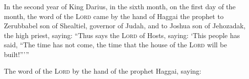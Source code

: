 
\begin{inparaenum}
     In the second year of King Darius, in the sixth month, on the first day of the month, the word of the \textsc{Lord} came by the hand of Haggai the prophet to Zerubbabel son of Shealtiel, governor of Judah, and to Joshua son of Jehozadak, the high priest, saying:%
     ``Thus says the \textsc{Lord} of Hosts, saying: `This people has said, ``The time has not come, the time that the house of the \textsc{Lord} will be built!''\thinspace'\thinspace''%
    
     The word of the \textsc{Lord} by the hand of the prophet Haggai, saying:\smallskip%
    
    
    
    
    
    
    
    \bigskip%
    
     \smallskip%
    
    \pvca{}%
    
    
    \pvcc{}{}{}%
    
    
    \pvcb{}{}%
    
    \pvcb{}{}%
    
    
    
    \pvcb{}{}%
    
    \pvcb{}{}\bigskip%
    
    
\end{inparaenum}
